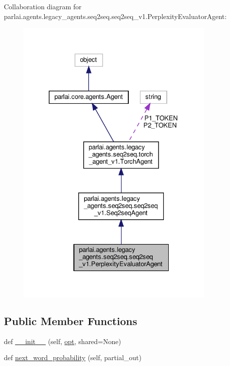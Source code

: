 Collaboration diagram for parlai.\+agents.\+legacy\+\_\+agents.\+seq2seq.\+seq2seq\+\_\+v1.\+Perplexity\+Evaluator\+Agent\+:
\nopagebreak
\begin{figure}[H]
\begin{center}
\leavevmode
\includegraphics[width=279pt]{classparlai_1_1agents_1_1legacy__agents_1_1seq2seq_1_1seq2seq__v1_1_1PerplexityEvaluatorAgent__coll__graph}
\end{center}
\end{figure}
\subsection*{Public Member Functions}
\begin{DoxyCompactItemize}
\item 
def \hyperlink{classparlai_1_1agents_1_1legacy__agents_1_1seq2seq_1_1seq2seq__v1_1_1PerplexityEvaluatorAgent_acf3daa1b1bfc893504efa07f3eb9b667}{\+\_\+\+\_\+init\+\_\+\+\_\+} (self, \hyperlink{classparlai_1_1agents_1_1legacy__agents_1_1seq2seq_1_1torch__agent__v1_1_1TorchAgent_a4e938a91873bd6edde0ac7ed5299bc6a}{opt}, shared=None)
\item 
def \hyperlink{classparlai_1_1agents_1_1legacy__agents_1_1seq2seq_1_1seq2seq__v1_1_1PerplexityEvaluatorAgent_a577da407eed3f8757efeab3522f2717b}{next\+\_\+word\+\_\+probability} (self, partial\+\_\+out)
\end{DoxyCompactItemize}
